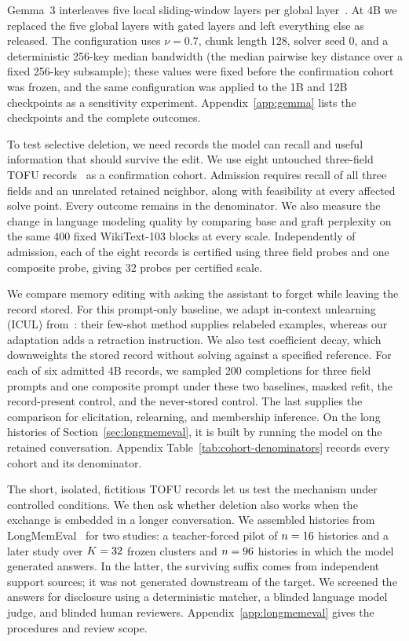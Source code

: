 Gemma~3 interleaves five local sliding-window layers per global
layer~\citep{gemma3}. At 4B we replaced the five global layers with gated
layers and left everything else as released. The configuration uses \(\nu=0.7\),
chunk length 128, solver seed 0, and a deterministic 256-key median bandwidth
(the median pairwise key distance over a fixed 256-key subsample);
these values were fixed before the confirmation cohort was frozen, and the same
configuration was applied to the 1B and 12B checkpoints as a sensitivity experiment.
Appendix~\ref{app:gemma} lists the checkpoints and the complete outcomes.

To test selective deletion, we need records the model can recall and useful
information that should survive the edit. We use eight untouched
three-field TOFU records~\citep{tofu} as a confirmation cohort. Admission
requires recall of all three fields and an unrelated retained neighbor,
along with feasibility at every affected solve point. Every outcome remains
in the denominator. We also measure the change in language modeling quality
by comparing base and graft perplexity on the same 400 fixed WikiText-103
blocks at every scale. Independently of admission, each of the eight records
is certified using three field probes and one composite probe, giving
32 probes per certified scale.

We compare memory editing with asking the assistant to forget while leaving
the record stored. For this prompt-only baseline, we adapt in-context
unlearning (ICUL) from~\citet{icul}: their few-shot method supplies relabeled
examples, whereas our adaptation adds a retraction instruction. We also
test coefficient decay, which downweights the stored record without solving
against a specified reference. For each of six admitted 4B records, we
sampled 200 completions for three field prompts and one composite prompt
under these two baselines, masked refit, the record-present control, and
the never-stored control. The last supplies the comparison for elicitation,
relearning, and membership inference. On the long histories of
Section~\ref{sec:longmemeval}, it is built by running the model on the retained
conversation. Appendix Table~\ref{tab:cohort-denominators} records every
cohort and its denominator.

The short, isolated, fictitious TOFU records let us test the mechanism under
controlled conditions. We then ask whether deletion also works when the
exchange is embedded in a longer conversation. We assembled histories from
LongMemEval~\citep{longmemeval} for two studies: a teacher-forced pilot of
\(n=16\) histories and a later study over
\(K=32\) frozen clusters and \(n=96\) histories
in which the model generated answers. In the latter, the surviving suffix
comes from independent support sources; it was not generated downstream of
the target. We screened the answers for disclosure using a deterministic
matcher, a blinded language model judge, and blinded human reviewers.
Appendix~\ref{app:longmemeval} gives the procedures and review scope.


